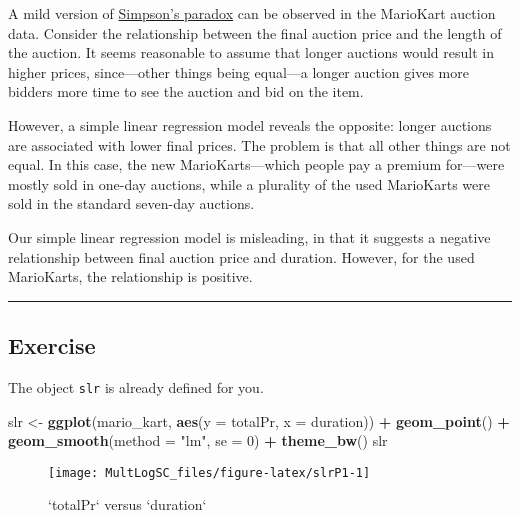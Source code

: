 \documentclass[]{book}
\newenvironment{Shaded}{\begin{snugshade}}{\end{snugshade}}
\newcommand{\KeywordTok}[1]{\textcolor[rgb]{0.13,0.29,0.53}{\textbf{#1}}}
\newcommand{\DataTypeTok}[1]{\textcolor[rgb]{0.13,0.29,0.53}{#1}}
\newcommand{\DecValTok}[1]{\textcolor[rgb]{0.00,0.00,0.81}{#1}}
\newcommand{\StringTok}[1]{\textcolor[rgb]{0.31,0.60,0.02}{#1}}
\newcommand{\OperatorTok}[1]{\textcolor[rgb]{0.81,0.36,0.00}{\textbf{#1}}}
\newcommand{\NormalTok}[1]{#1}
\begin{document}
A mild version of
\href{https://en.wikipedia.org/wiki/Simpson\%27s_paradox}{Simpson's
paradox} can be observed in the MarioKart auction data. Consider the
relationship between the final auction price and the length of the
auction. It seems reasonable to assume that longer auctions would result
in higher prices, since---other things being equal---a longer auction
gives more bidders more time to see the auction and bid on the item.

However, a simple linear regression model reveals the opposite: longer
auctions are associated with lower final prices. The problem is that all
other things are not equal. In this case, the new MarioKarts---which
people pay a premium for---were mostly sold in one-day auctions, while a
plurality of the used MarioKarts were sold in the standard seven-day
auctions.

Our simple linear regression model is misleading, in that it suggests a
negative relationship between final auction price and duration. However,
for the used MarioKarts, the relationship is positive.

\begin{center}\rule{0.5\linewidth}{\linethickness}\end{center}

\subsection*{Exercise}\label{exercise-8}

The object \texttt{slr} is already defined for you.

\begin{Shaded}
\begin{Highlighting}[]
\NormalTok{slr <-}\StringTok{ }\KeywordTok{ggplot}\NormalTok{(mario_kart, }\KeywordTok{aes}\NormalTok{(}\DataTypeTok{y =}\NormalTok{ totalPr, }\DataTypeTok{x =}\NormalTok{ duration)) }\OperatorTok{+}\StringTok{ }
\StringTok{  }\KeywordTok{geom_point}\NormalTok{() }\OperatorTok{+}\StringTok{ }
\StringTok{  }\KeywordTok{geom_smooth}\NormalTok{(}\DataTypeTok{method =} \StringTok{"lm"}\NormalTok{, }\DataTypeTok{se =} \DecValTok{0}\NormalTok{) }\OperatorTok{+}\StringTok{ }
\StringTok{  }\KeywordTok{theme_bw}\NormalTok{()}
\NormalTok{slr}
\end{Highlighting}
\end{Shaded}

\begin{figure}

{\centering \texttt{[image: MultLogSC\_files/figure-latex/slrP1-1]} 

}

\caption{`totalPr` versus `duration`}\label{fig:slrP1}
\end{figure}
\end{document}
